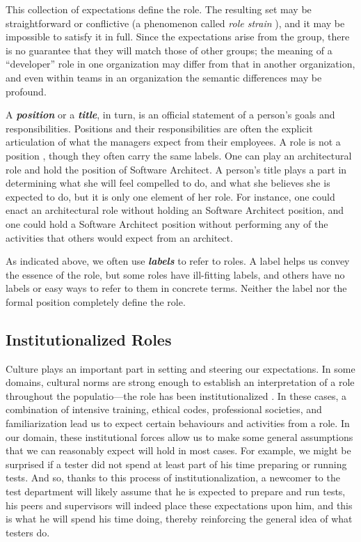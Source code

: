 \documentclass[10pt, conference, compsocconf]{IEEEtran}
\begin{document}
This collection of expectations define the role. The resulting set may be straightforward or conflictive (a phenomenon called \emph{role strain} \cite{Goode1960}), and it may be impossible to satisfy it in full. Since the expectations arise from the group, there is no guarantee that they will match those of other groups; the meaning of a ``developer'' role in one organization may differ from that in another organization, and even within teams in an organization the semantic differences may be profound.

A \textbf{\emph{position}} or a \textbf{\emph{title}}, in turn, is an official statement of a person's goals and responsibilities. Positions and their responsibilities are often the explicit articulation of what the managers expect from their employees. A role is not a position \cite{Turner1956}, though they often carry the same labels. One can play an architectural role and hold the position of Software Architect. A person's title plays a part in determining what she will feel compelled to do, and what she believes she is expected to do, but it is only one element of her role. For instance, one could enact an architectural role without holding an Software Architect position, and one could hold a Software Architect position without performing any of the activities that others would expect from an architect.

As indicated above, we often use \textbf{\emph{labels}} to refer to roles. A label helps us convey the essence of the role, but some roles have ill-fitting labels, and others have no labels or easy ways to refer to them in concrete terms. Neither the label nor the formal position completely define the role.


\subsection{Institutionalized Roles}

Culture plays an important part in setting and steering our expectations. In some domains, cultural norms are strong enough to establish an interpretation of a role throughout the populatio---the role has been institutionalized \cite{DiMaggio1991}. In these cases, a combination of intensive training, ethical codes, professional societies, and familiarization lead us to expect certain behaviours and activities from a role. In our domain, these institutional forces allow us to make some general assumptions that we can reasonably expect will hold in most cases. For example, we might be surprised if a tester did not spend at least part of his time preparing or running tests. And so, thanks to this process of institutionalization, a newcomer to the test department will likely assume that he is expected to prepare and run tests, his peers and supervisors will indeed place these expectations upon him, and this is what he will spend his time doing, thereby reinforcing the general idea of what testers do.
\end{document}
